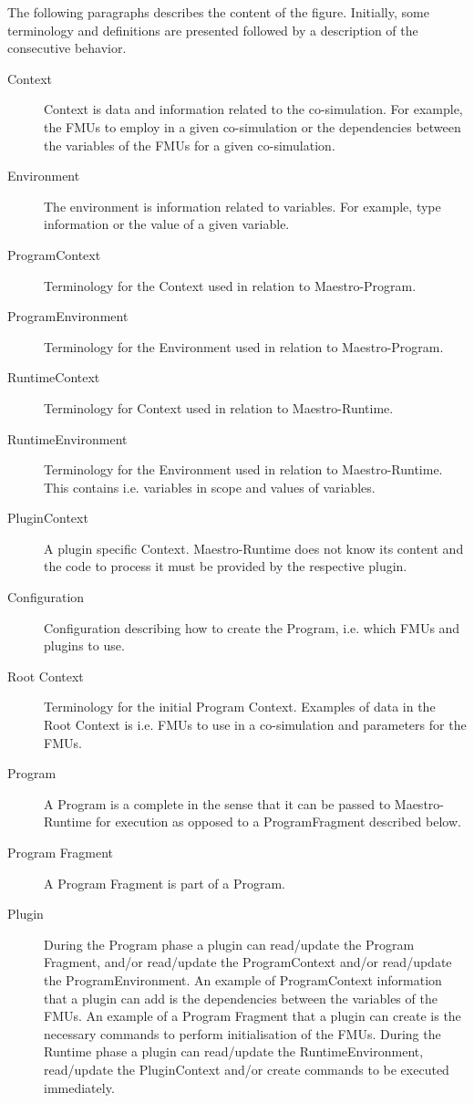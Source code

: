 The following paragraphs describes the content of the figure. Initially, some
terminology and definitions are presented followed by a description of the
consecutive behavior.
\begin{description}
  \item[Context] Context is data and information related to the co-simulation.
For example, the FMUs to employ in a given co-simulation or the dependencies
between the variables of the FMUs for a given co-simulation.
  \item[Environment] The environment is information related to variables. For
example, type information or the value of a given variable.
  \item[ProgramContext] Terminology for the Context used in relation to
Maestro-Program.
  \item[ProgramEnvironment] Terminology for the Environment used in relation to
Maestro-Program.
  \item[RuntimeContext] Terminology for Context used in relation to
Maestro-Runtime.
  \item[RuntimeEnvironment] Terminology for the Environment used in relation to
Maestro-Runtime. This contains i.e. variables in scope and values of variables.
  \item[PluginContext] A plugin specific Context. Maestro-Runtime does not know
its content and the code to process it must be provided by the respective
plugin.
  \item[Configuration] Configuration describing how to create the Program, i.e.
which FMUs and plugins to use.
  \item[Root Context] Terminology for the initial Program Context. Examples of
data in the Root Context is i.e. FMUs to use in a co-simulation and parameters
for the FMUs.
  \item[Program] A Program is a complete in the sense that it can be passed to
Maestro-Runtime for execution as opposed to a ProgramFragment described below.
  \item[Program Fragment] A Program Fragment is part of a Program.
  \item[Plugin] During the Program phase a plugin can read/update the Program
Fragment, and/or read/update the ProgramContext and/or read/update the
ProgramEnvironment. An example of ProgramContext information that a plugin can
add is the dependencies between the variables of the FMUs. An example of a
Program Fragment that a plugin can create is the necessary commands to perform
initialisation of the FMUs. During the Runtime phase a plugin can read/update
the RuntimeEnvironment, read/update the PluginContext and/or create commands to
be executed immediately.
\end{description}

